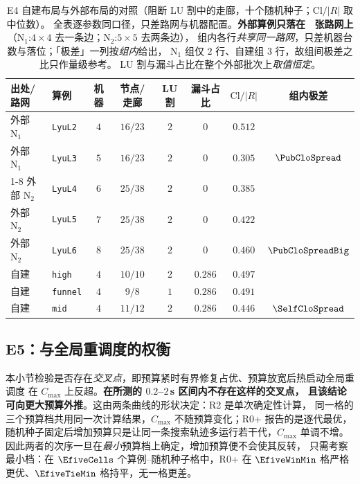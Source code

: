 \begin{table}[t]
\centering
\caption{E4 自建布局与外部布局的对照（阻断 LU 割中的走廊，十个随机种子；\(\mathrm{Cl}/|R|\) 取中位数）。
全表逐参数同口径，只差路网与机器配置。\textbf{外部算例只落在 \NPubNets\ 张路网上}
（\(\mathrm{N}_1\):\(4\times 4\) 去一条边；\(\mathrm{N}_2\):\(5\times 5\) 去两条边），
组内各行\emph{共享同一路网}，只差机器台数与落位；「极差」一列按\emph{组内}给出，
\(\mathrm{N}_1\) 组仅 \(2\) 行、自建组 \(3\) 行，故组间极差之比只作量级参考。
LU 割与漏斗占比在整个外部批次上\emph{取值恒定}。}
\label{tab:e4pub}
\small
\begin{tabular}{@{}llcccccc@{}}
\toprule
出处/路网 & 算例 & 机器 & 节点/走廊 & LU 割 & 漏斗占比 & \(\mathrm{Cl}/|R|\)
 & 组内极差 \\
\midrule
外部 \(\mathrm{N}_1\) & \texttt{LyuL2} & \(4\) & \(16/23\) & \(2\) & \(0\) & \(0.512\) & \\
外部 \(\mathrm{N}_1\) & \texttt{LyuL3} & \(5\) & \(16/23\) & \(2\) & \(0\) & \(0.305\)
  & \(\PubCloSpread\) \\
\cmidrule{1-8}
外部 \(\mathrm{N}_2\) & \texttt{LyuL4} & \(6\) & \(25/38\) & \(2\) & \(0\) & \(0.385\) & \\
外部 \(\mathrm{N}_2\) & \texttt{LyuL5} & \(7\) & \(25/38\) & \(2\) & \(0\) & \(0.422\) & \\
外部 \(\mathrm{N}_2\) & \texttt{LyuL6} & \(8\) & \(25/38\) & \(2\) & \(0\) & \(0.460\)
  & \(\PubCloSpreadBig\) \\
\midrule
自建 & \texttt{high} & \(4\) & \(10/10\) & \(2\) & \(0.286\) & \(0.497\) & \\
自建 & \texttt{funnel} & \(4\) & \(9/8\) & \(1\) & \(0.286\) & \(0.491\) & \\
自建 & \texttt{mid} & \(4\) & \(11/12\) & \(2\) & \(0.286\) & \(0.446\)
  & \(\SelfCloSpread\) \\
\bottomrule
\end{tabular}
\end{table}

\subsection{E5：与全局重调度的权衡}
\label{sec:e5}

本小节检验是否存在\emph{交叉点}，即预算紧时有界修复占优、预算放宽后热启动全局重调度
在 \(C_{\max}\) 上反超。\textbf{在所测的 \(0.2\)--\(2\)\,s 区间内不存在这样的交叉点，
且该结论可向更大预算外推}。这由两条曲线的形状决定：R2 是单次确定性计算，
同一格的三个预算档共用同一次计算结果，\(C_{\max}\) 不随预算变化；R0+ 报告的是逐代最优，
随机种子固定后增加预算只是让同一条搜索轨迹多运行若干代，\(C_{\max}\) 单调不增。
因此两者的次序一旦在\emph{最小}预算档上确定，增加预算便不会使其反转，
只需考察最小档：在 \(\EfiveCells\) 个算例--随机种子格中，R0+ 在 \(\EfiveWinMin\) 格严格
更优、\(\EfiveTieMin\) 格持平，无一格更差。


